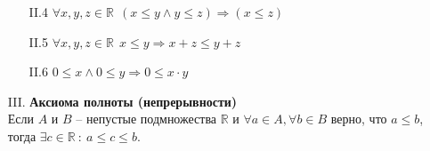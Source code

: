 \begin{definition}
\begin{itemize}
\begin{itemize}
        \item[II.4] $\forall x, y, z \in \mathbb{R} \ \ (x \leq y \wedge  y \leq z) \Rightarrow (x \leq z)$
        \item[II.5] $\forall x, y, z \in \mathbb{R} \ \ x \leq y \Rightarrow x + z \leq y + z$
        \item[II.6] $0 \leq x \wedge 0 \leq y \Rightarrow 0 \leq x \cdot y$
    \end{itemize}
    \item[III.] \textbf{Аксиома полноты (непрерывности)} \\
        Если $A$ и $B$ -- непустые подмножества $\mathbb{R}$ и $\forall a \in A, \forall b \in B$ верно, что $a \leq b$, тогда $\exists c \in \mathbb{R} \ : \ a \leq c \leq b$.
        
\end{itemize}
\end{definition}
